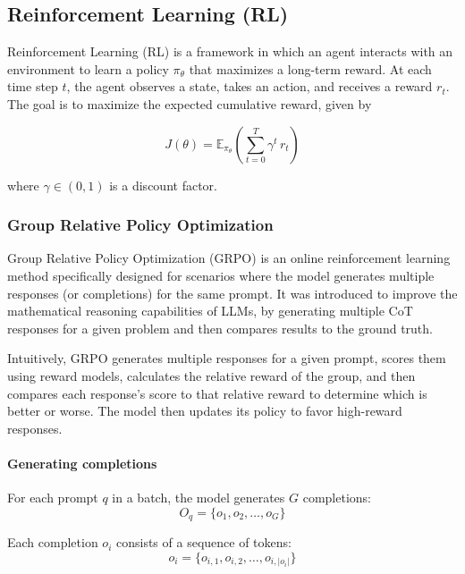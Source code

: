 \subsection{Reinforcement Learning (RL)} \label{app:rl}

Reinforcement Learning (RL) is a framework in which an agent interacts with an environment to learn a policy $\pi_\theta$ that maximizes a long-term reward. At each time step $t$, the agent observes a state, takes an action, and receives a reward $r_t$. The goal is to maximize the expected cumulative reward, given by

\begin{equation}
J(\theta) = \mathbb{E}_{\pi_\theta}\left( \sum_{t=0}^{T} \gamma^t\,r_t\right)
\end{equation}

where $\gamma\in(0,1)$ is a discount factor.

\subsubsection{Group Relative Policy Optimization} \label{app:grpo}

Group Relative Policy Optimization (GRPO) \citet{DeepSeek-AIDEEPSEEKR12025} is an online reinforcement learning method specifically designed for scenarios where the model generates multiple responses (or completions) for the same prompt. It was introduced to improve the mathematical reasoning capabilities of LLMs, by generating multiple CoT responses for a given problem and then compares results to the ground truth.

Intuitively, GRPO generates multiple responses for a given prompt, scores them using reward models, calculates the relative reward of the group, and then compares each response's score to that relative reward to determine which is better or worse. The model then updates its policy to favor high-reward responses.

\paragraph{Generating completions} For each prompt $q$ in a batch, the model generates $G$ completions:
\begin{equation}
O_q = \{o_1, o_2, \ldots, o_G\}
\end{equation}

Each completion $o_i$ consists of a sequence of tokens:
\begin{equation}
o_i = \{o_{i,1}, o_{i,2}, \ldots, o_{i,|o_i|}\}
\end{equation}

